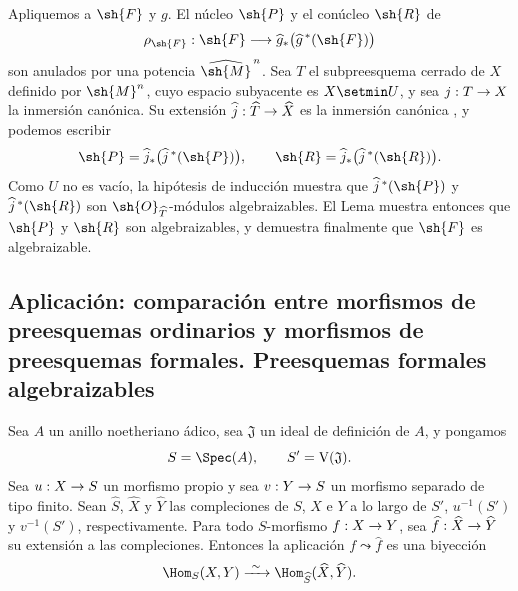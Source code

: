 \documentclass[oneside]{amsart}
\makeatletter
\newcommand{\ega@arrow}[2]{\mathchoice{#1}{#2}{#2}{#2}}
\renewcommand{\to}{\ega@arrow{\longrightarrow}{\rightarrow}}
\let\EGAOriginalLabel\label
\renewcommand{\label}[1]{\phantomsection\EGAOriginalLabel{#1}}
\makeatother
\begin{document}
\begin{env}[5.3.5]
Apliquemos  a $\sh{F}$ y $g$. El núcleo $\sh{P}$
y el conúcleo $\sh{R}$ de
\[
  \rho_{\sh{F}}:
  \sh{F}\longrightarrow
  \widehat{g}_*\bigl(\widehat{g}^{\,*}(\sh{F})\bigr)
\]
son anulados por una potencia $\widehat{\sh{M}}^{\,n}$. Sea $T$
el subpreesquema cerrado de $X$ definido por $\sh{M}^n$, cuyo
espacio subyacente es $X\setmin U$, y sea $j:T\to X$ la inmersión
canónica. Su extensión
$\widehat{j}:\widehat{T}\to\widehat{X}$ es la inmersión canónica
, y podemos escribir
\[
  \sh{P}=
  \widehat{j}_*\bigl(\widehat{j}^{\,*}(\sh{P})\bigr),
  \qquad
  \sh{R}=
  \widehat{j}_*\bigl(\widehat{j}^{\,*}(\sh{R})\bigr).
\]
Como $U$ no es vacío, la hipótesis de inducción muestra que
$\widehat{j}^{\,*}(\sh{P})$ y
$\widehat{j}^{\,*}(\sh{R})$ son $\sh{O}_{\widehat{T}}$-módulos
algebraizables. El Lema  muestra entonces
que $\sh{P}$ y $\sh{R}$ son algebraizables, y
 demuestra finalmente que $\sh{F}$ es algebraizable.
\end{env}


\subsection{Aplicación: comparación entre morfismos de preesquemas ordinarios y morfismos de preesquemas formales. Preesquemas formales algebraizables}
\label{subsection:III.5.4}

\begin{theorem}[5.4.1]
\label{III.5.4.1}
Sea $A$ un anillo noetheriano ádico, sea $\mathfrak{J}$ un ideal
de definición de $A$, y pongamos
\[
  S=\Spec(A),\qquad S'=\mathrm{V}(\mathfrak{J}).
\]
Sea $u:X\to S$ un morfismo propio y sea $v:Y\to S$ un
morfismo separado de tipo finito. Sean
$\widehat{S}$, $\widehat{X}$ y $\widehat{Y}$ las compleciones
de $S$, $X$ e $Y$ a lo largo de $S'$, $u^{-1}(S')$ y $v^{-1}(S')$,
respectivamente. Para todo $S$-morfismo $f:X\to Y$, sea
$\widehat{f}:\widehat{X}\to\widehat{Y}$ su extensión a las
compleciones. Entonces la aplicación $f\leadsto\widehat{f}$ es una biyección
\[
  \Hom_S(X,Y)
  \xrightarrow{\ \sim\ }
  \Hom_{\widehat{S}}(\widehat{X},\widehat{Y}).
\]
\end{theorem}
\end{document}
